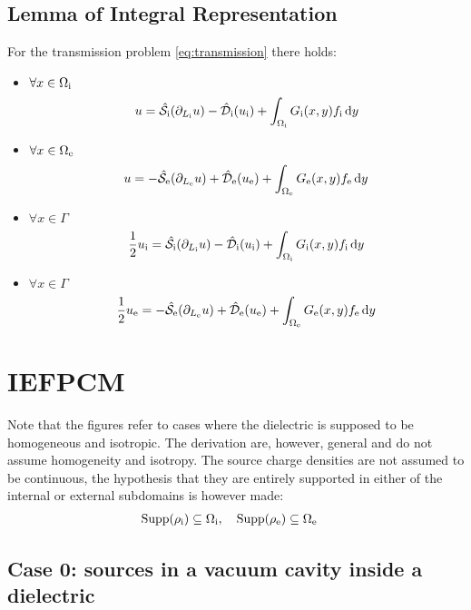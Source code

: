 \subsection{Lemma of Integral Representation}
For the transmission problem \ref{eq:transmission} there holds:
\begin{itemize}
\item $\forall x \in \Omega_\mathrm{i}$
\begin{equation}
u = \hat{\mathcal{S}}_\mathrm{i}(\partial_{L_\mathrm{i}} u)
- \hat{\mathcal{D}}_\mathrm{i}(u_\mathrm{i}) + \int_{\Omega_\mathrm{i}} G_\mathrm{i}(x, y) f_\mathrm{i}\mathop{}\!\mathrm{d} y
\end{equation}
\item $\forall x \in \Omega_\mathrm{e}$
\begin{equation}
u = -\hat{\mathcal{S}}_\mathrm{e}(\partial_{L_\mathrm{e}} u)
+ \hat{\mathcal{D}}_\mathrm{e}(u_\mathrm{e}) + \int_{\Omega_\mathrm{e}}G_\mathrm{e}(x, y) f_\mathrm{e}\mathop{}\!\mathrm{d} y
\end{equation}
\item $\forall x \in \Gamma$
  \begin{equation}\label{eq:stat3}
    \frac{1}{2}u_\mathrm{i} = \hat{\mathcal{S}}_\mathrm{i}(\partial_{L_\mathrm{i}} u)
    - \hat{\mathcal{D}}_\mathrm{i}(u_\mathrm{i}) + \int_{\Omega_\mathrm{i}}G_\mathrm{i}(x, y) f_\mathrm{i}\mathop{}\!\mathrm{d} y
  \end{equation}
\item $\forall x \in \Gamma$
  \begin{equation}\label{eq:stat4}
    \frac{1}{2}u_\mathrm{e} = -\hat{\mathcal{S}}_\mathrm{e}(\partial_{L_\mathrm{e}} u)
    + \hat{\mathcal{D}}_\mathrm{e}(u_\mathrm{e}) + \int_{\Omega_\mathrm{e}}G_\mathrm{e}(x, y) f_\mathrm{e}\mathop{}\!\mathrm{d} y
  \end{equation}
\end{itemize}

\pagebreak
\section{IEFPCM}\label{sec:IEF}

Note that the figures refer to cases where the dielectric is supposed to
be homogeneous and isotropic. The derivation are, however, general and
do not assume homogeneity and isotropy.
The source charge densities are not assumed to be continuous, the
hypothesis that they are entirely supported in either of the internal or
external subdomains is however made:
\begin{alignat}{2}
  \mathop{}\!\mathrm{Supp}(\rho_\mathrm{i}) \subseteq \Omega_\mathrm{i}, \quad& \mathop{}\!\mathrm{Supp}(\rho_\mathrm{e}) \subseteq \Omega_\mathrm{e}
\end{alignat}


\subsection{Case 0: sources in a vacuum cavity inside a dielectric}

